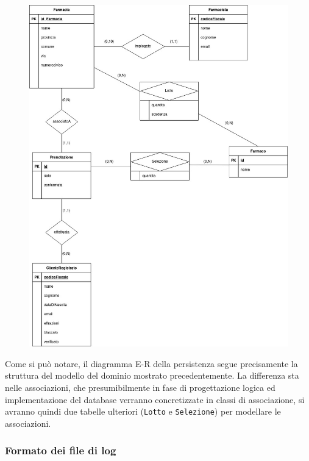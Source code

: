 \begin{figure}[h!]
    \begin{center}
        \includegraphics[scale=0.545]{immagini/DiagrammaE-R.jpg}
    \end{center}
\end{figure}

Come si può notare, il diagramma E-R della persistenza segue precisamente la struttura del modello del dominio mostrato precedentemente.
La differenza sta nelle associazioni, che presumibilmente in fase di progettazione logica ed implementazione del database verranno concretizzate in classi di associazione,
si avranno quindi due tabelle ulteriori (\texttt{Lotto} e \texttt{Selezione}) per modellare le associazioni.

\subsubsection{Formato dei file di log}

